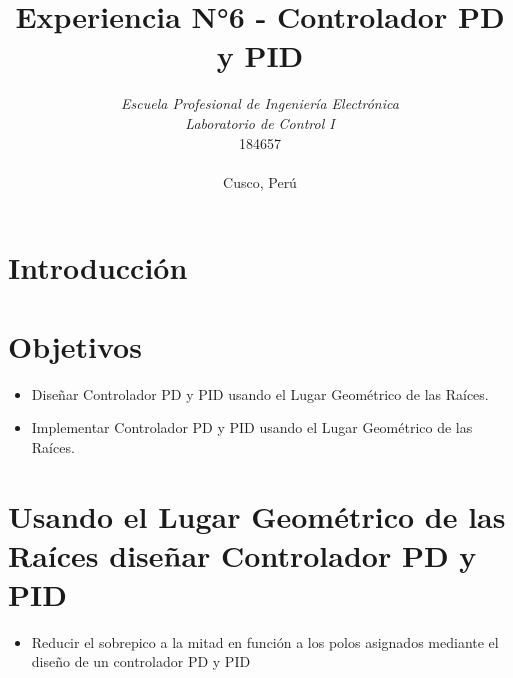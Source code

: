 \documentclass[conference]{IEEEtran}
\begin{document}
	
	\title{Experiencia N°6 - Controlador PD y PID}
	\author{	
		\textit{Escuela Profesional de Ingeniería Electrónica}\\
		\textit{Laboratorio de Control I}\\
		184657 \\\\
		Cusco, Perú
	}
	
	\maketitle
	
	\begin{abstract}
		
	\end{abstract}
	
	\begin{IEEEkeywords}
		
	\end{IEEEkeywords}
	
	\section{Introducción}
	
	\section{Objetivos}
	
	\begin{itemize}
		\item Diseñar Controlador PD y PID usando el Lugar Geométrico de las Raíces.
		\item Implementar Controlador PD y PID usando el Lugar Geométrico de las Raíces.
	\end{itemize}
	
	\section{Usando el Lugar Geométrico de las Raíces diseñar Controlador PD y PID}
	
	\begin{itemize}
		\item Reducir el sobrepico a la mitad en función a los polos asignados mediante el diseño de un controlador PD y PID
	\end{itemize}
	
\end{document}
